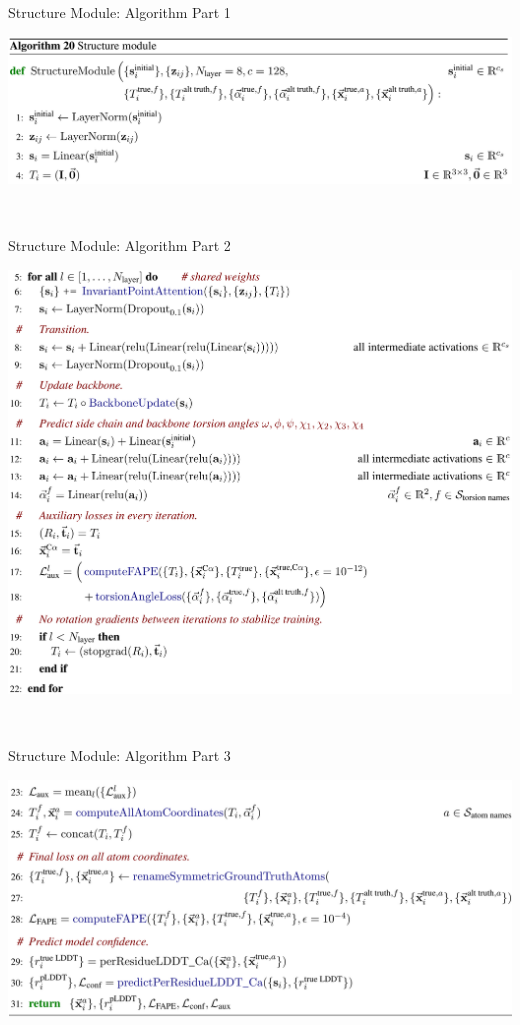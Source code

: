 \documentclass[presentation, smaller]{beamer}
\begin{document}
\begin{frame}[label={sec:org67dc9c3}]{Structure Module: Algorithm Part 1}
\begin{center}
\includegraphics[width=.9\linewidth]{./imgs/algo20-part1.png}
\end{center}~\cite{jumperHighlyAccurateProtein2021}
\end{frame}
\begin{frame}[label={sec:org33a23ed}]{Structure Module: Algorithm Part 2}
\begin{center}
\includegraphics[width=.9\linewidth]{./imgs/algo20-part2.png}
\end{center}~\cite{jumperHighlyAccurateProtein2021}
\end{frame}
\begin{frame}[label={sec:orge205c0b}]{Structure Module: Algorithm Part 3}
\begin{center}
\includegraphics[width=.9\linewidth]{./imgs/algo20-part3.png}
\end{center}~\cite{jumperHighlyAccurateProtein2021}
\end{frame}
\end{document}
